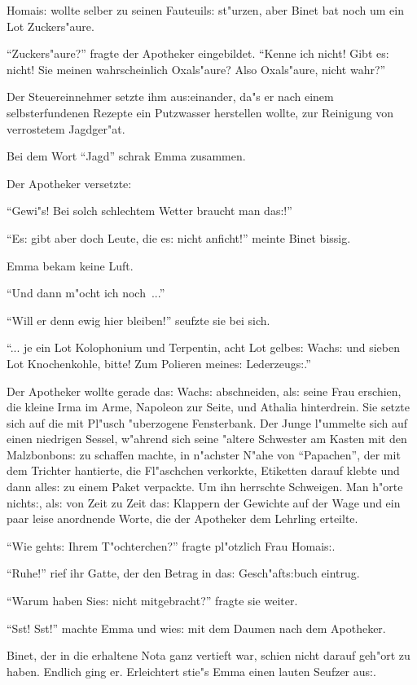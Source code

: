 \documentclass[oneside,12pt]{book}
\newcommand{\s}{s:}%
\begin{document}
Homai{\s} wollte selber zu seinen Fauteuil{\s} st"urzen, aber
Binet bat noch um ein Lot Zuckers"aure.

"`Zuckers"aure?"' fragte der Apotheker eingebildet. "`Kenne ich
nicht! Gibt e{\s} nicht! Sie meinen wahrscheinlich Oxals"aure?
Also Oxals"aure, nicht wahr?"'

Der Steuereinnehmer setzte ihm au{\s}einander, da"s er nach einem
selbsterfundenen Rezepte ein Putzwasser herstellen wollte, zur
Reinigung von verrostetem Jagdger"at.

Bei dem Wort "`Jagd"' schrak Emma zusammen.

Der Apotheker versetzte:

"`Gewi"s! Bei solch schlechtem Wetter braucht man da{\s}!"'

"`E{\s} gibt aber doch Leute, die e{\s} nicht anficht!"' meinte
Binet bissig.

Emma bekam keine Luft.

"`Und dann m"ocht ich noch~..."'

"`Will er denn ewig hier bleiben!"' seufzte sie bei sich.

"`... je ein Lot Kolophonium und Terpentin, acht Lot gelbe{\s}
Wach{\s} und sieben Lot Knochenkohle, bitte! Zum Polieren
meine{\s} Lederzeug{\s}."'

Der Apotheker wollte gerade da{\s} Wach{\s} abschneiden, al{\s}
seine Frau erschien, die kleine Irma im Arme, Napoleon zur Seite,
und Athalia hinterdrein. Sie setzte sich auf die mit Pl"usch
"uberzogene Fensterbank. Der Junge l"ummelte sich auf einen
niedrigen Sessel, w"ahrend sich seine "altere Schwester am Kasten
mit den Malzbonbon{\s} zu schaffen machte, in n"achster N"ahe von
"`Papachen"', der mit dem Trichter hantierte, die Fl"aschchen
verkorkte, Etiketten darauf klebte und dann alle{\s} zu einem
Paket verpackte. Um ihn herrschte Schweigen. Man h"orte nicht{\s},
al{\s} von Zeit zu Zeit da{\s} Klappern der Gewichte auf der Wage
und ein paar leise anordnende Worte, die der Apotheker dem
Lehrling erteilte.

"`Wie geht{\s} Ihrem T"ochterchen?"' fragte pl"otzlich Frau
Homai{\s}.

"`Ruhe!"' rief ihr Gatte, der den Betrag in da{\s}
Gesch"aft{\s}buch eintrug.

"`Warum haben Sie{\s} nicht mitgebracht?"' fragte sie weiter.

"`Sst! Sst!"' machte Emma und wie{\s} mit dem Daumen nach dem
Apotheker.

Binet, der in die erhaltene Nota ganz vertieft war, schien nicht
darauf geh"ort zu haben. Endlich ging er. Erleichtert stie"s Emma
einen lauten Seufzer au{\s}.
\end{document}
